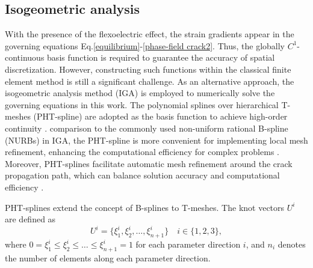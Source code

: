 \documentclass[final,times,fleqn,11pt]{elsarticle}
\begin{document}
\subsection{Isogeometric analysis}
With the presence of the flexoelectric effect, the strain gradients appear in the governing equations Eq.\eqref{equilibrium}-\eqref{phase-field crack2}. Thus, the globally $C^1$-continuous basis function is required to guarantee the accuracy of spatial discretization. However, constructing such functions within the classical finite element method is still a significant challenge. As an alternative approach, the isogeometric analysis method (IGA) is employed to numerically solve the governing equations in this work. The polynomial splines over hierarchical T-meshes (PHT-spline) are adopted as the basis function to achieve high-order continuity \cite{deng_polynomial_2008}. comparison to the commonly used non-uniform rational B-spline (NURBs) in IGA, the PHT-spline is more convenient for implementing local mesh refinement, enhancing the computational efficiency for complex problems \cite{anitescu_recovery-based_2018}. Moreover, PHT-splines facilitate automatic mesh refinement around the crack propagation path, which can balance solution accuracy and computational efficiency \cite{goswami_adaptive_2020}.

PHT-splines extend the concept of B-splines to T-meshes. The knot vectors $U^i$ are defined as 
\begin{equation}
    U^i=\{\xi_1^i, \xi_2^i, \ldots, \xi_{n+1}^i\} \quad i\in\{1,2,3\},
\end{equation}
where $0=\xi_1^i\leq\xi_2^i\leq \ldots \leq\xi_{n+1}^i=1$ for each parameter direction $i$, and $n_i$ denotes the number of elements along each parameter direction.
\end{document}

